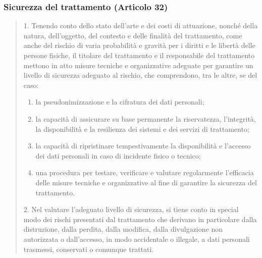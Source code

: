 \subsubsection*{Sicurezza del trattamento (Articolo 32)}
\begin{quote}
    1. Tenendo conto dello stato dell'arte e dei costi di attuazione, nonché della natura, dell'oggetto, del contesto e delle finalità del trattamento, come anche del rischio di varia probabilità e gravità per i diritti e le libertà delle persone fisiche, il titolare del trattamento e il responsabile del trattamento mettono in atto misure tecniche e organizzative adeguate per garantire un livello di sicurezza adeguato al rischio, che comprendono, tra le altre, se del caso:
    \begin{enumerate}[label=\alph*)]
        \item la pseudonimizzazione e la cifratura dei dati personali;
        \item la capacità di assicurare su base permanente la riservatezza, l'integrità, la disponibilità e la resilienza dei sistemi e dei servizi di trattamento;
        \item la capacità di ripristinare tempestivamente la disponibilità e l'accesso dei dati personali in caso di incidente fisico o tecnico;
        \item una procedura per testare, verificare e valutare regolarmente l'efficacia delle misure tecniche e organizzative al fine di garantire la sicurezza del trattamento.
    \end{enumerate}
       
    2. Nel valutare l'adeguato livello di sicurezza, si tiene conto in special modo dei rischi presentati dal trattamento che derivano in particolare dalla distruzione, dalla perdita, dalla modifica, dalla divulgazione non autorizzata o dall'accesso, in modo accidentale o illegale, a dati personali trasmessi, conservati o comunque trattati.
\end{quote}

